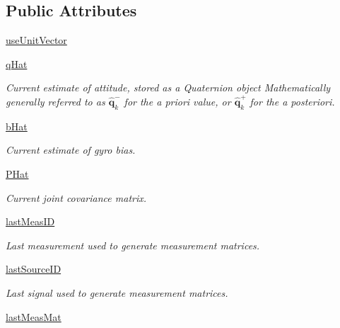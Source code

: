 \subsection*{Public Attributes}
\begin{DoxyCompactItemize}
\item 
\hyperlink{classmodest_1_1substates_1_1attitude_1_1Attitude_a528738f0ad3971fd2476007cc5ef0e1e}{use\+Unit\+Vector}
\item 
\hyperlink{classmodest_1_1substates_1_1attitude_1_1Attitude_a22a550534d908153baef2e52f7142c5e}{q\+Hat}
\begin{DoxyCompactList}\small\item\em Current estimate of attitude, stored as a Quaternion object Mathematically generally referred to as $\mathbf{\hat{q}}^{-}_{k}$ for the a priori value, or $\mathbf{\hat{q}}^{+}_{k}$ for the a posteriori. \end{DoxyCompactList}\item 
\hyperlink{classmodest_1_1substates_1_1attitude_1_1Attitude_aac0bc92dc53893d2f190c1252690053c}{b\+Hat}
\begin{DoxyCompactList}\small\item\em Current estimate of gyro bias. \end{DoxyCompactList}\item 
\hyperlink{classmodest_1_1substates_1_1attitude_1_1Attitude_a2f79616ca660e0cc1e628adf94738249}{P\+Hat}
\begin{DoxyCompactList}\small\item\em Current joint covariance matrix. \end{DoxyCompactList}\item 
\hyperlink{classmodest_1_1substates_1_1attitude_1_1Attitude_abc1a273c6fd65c839184ae644b68f010}{last\+Meas\+ID}
\begin{DoxyCompactList}\small\item\em Last measurement used to generate measurement matrices. \end{DoxyCompactList}\item 
\hyperlink{classmodest_1_1substates_1_1attitude_1_1Attitude_a0ec5bf8475ca5c175e4a516d2ac68fdf}{last\+Source\+ID}
\begin{DoxyCompactList}\small\item\em Last signal used to generate measurement matrices. \end{DoxyCompactList}\item 
\hyperlink{classmodest_1_1substates_1_1attitude_1_1Attitude_add344f4323848f4ccdd9e59d699310a0}{last\+Meas\+Mat}

\end{DoxyCompactItemize}
